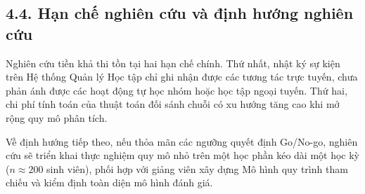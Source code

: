 \subsection{4.4. Hạn chế nghiên cứu và định hướng nghiên cứu}
Nghiên cứu tiền khả thi tồn tại hai hạn chế chính. Thứ nhất, nhật ký sự kiện trên Hệ thống Quản lý Học tập chỉ ghi nhận được các tương tác trực tuyến, chưa phản ánh được các hoạt động tự học nhóm hoặc học tập ngoại tuyến. Thứ hai, chi phí tính toán của thuật toán đối sánh chuỗi có xu hướng tăng cao khi mở rộng quy mô phân tích.

Về định hướng tiếp theo, nếu thỏa mãn các ngưỡng quyết định Go/No-go, nghiên cứu sẽ triển khai thực nghiệm quy mô nhỏ trên một học phần kéo dài một học kỳ ($n \approx 200$ sinh viên), phối hợp với giảng viên xây dựng Mô hình quy trình tham chiếu và kiểm định toàn diện mô hình đánh giá.
